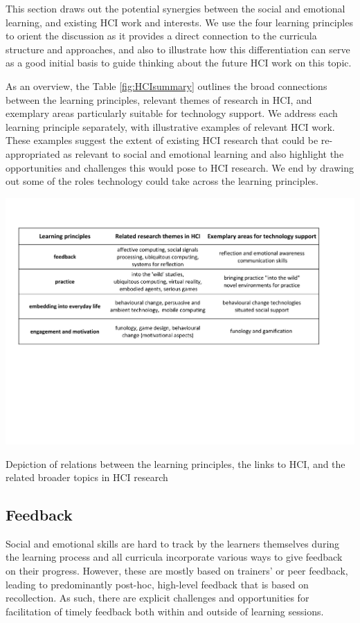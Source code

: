 \documentclass[prodmode,acmtochi]{acmsmall}
\newcommand{\GeraldineFIX}[1]{}
\begin{document}
This section draws out the potential synergies between the social and emotional learning, and existing HCI work and interests. We use the four learning principles to orient the discussion as it provides a direct connection to the curricula structure and approaches, and also to illustrate how this differentiation can serve as a good initial basis to guide thinking about the future HCI work on this topic. 

As an overview, the Table \ref{fig:HCIsummary} outlines the broad connections between the learning principles, relevant themes of research in HCI, and exemplary areas particularly suitable for technology support. We address each learning principle separately, with illustrative examples of relevant HCI work. These examples suggest the extent of existing HCI research that could be re-appropriated as relevant to social and emotional learning and also highlight the opportunities and challenges this would pose to HCI research. We end by drawing out some of the roles technology could take across the learning principles. 


\begin{table}
  \centering
        \includegraphics[width=\textwidth]{images/SummaryHCI}
        \caption{Depiction of relations between the learning  principles, the links to HCI, and the related broader topics in HCI research}
        \label{fig:HCIsummary}
\end{table}
\GeraldineFIX{ G: subtopics for feedback - reflect all of topics from earlier?; add 'scaffodling practise in class under practice subtopics?}

\subsection{Feedback}
\label{sec:feedback}
Social and emotional skills are hard to track by the learners themselves during the learning process and all curricula incorporate various ways to give feedback on their progress. However, these are mostly based on trainers' or peer feedback, leading to predominantly post-hoc, high-level feedback that is based on recollection. As such, there are explicit challenges and opportunities for facilitation of timely feedback both within and outside of learning sessions. 
\end{document}
